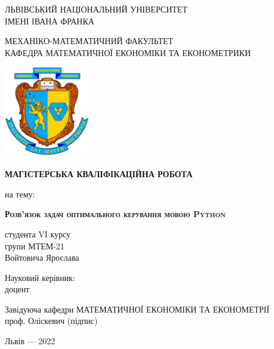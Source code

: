 \documentclass[a4paper,12pt]{extreport}
\begin{document}
    \begin{titlepage}%
        \begin{center}
            {ЛЬВІВСЬКИЙ НАЦІОНАЛЬНИЙ УНІВЕРСИТЕТ \\ ІМЕНІ ІВАНА ФРАНКА}\par
            {МЕХАНІКО-МАТЕМАТИЧНИЙ ФАКУЛЬТЕТ \\ КАФЕДРА МАТЕМАТИЧНОЇ ЕКОНОМІКИ ТА ЕКОНОМЕТРИКИ}\par
            \begin{center}
            \includegraphics[height=4cm]{figures/title_mexmat.jpg}
            \end{center}
            \vspace{10mm}
            \bf{\small{МАГІСТЕРСЬКА КВАЛІФІКАЦІЙНА РОБОТА}}\par
        {\small{на тему:}}\par
            \vspace{20mm}
            {\LARGE{\bf{\scshape{Розв'язок задач оптимального керування мовою Python}}}}\par
            \vspace{5mm}
            {}\par %
        \end{center}
        \vfill
        \hfill
        \begin{flushright}
        \begin{minipage}[t]{80mm}
            \flushright
            студента VI курсу\\
            групи МТЕМ-21\\
            {Войтовича Ярослава}\par
            \vspace{2ex}
            Науковий керівник:\\
            {доцент}\\
        \end{minipage}
        \end{flushright}
        \vspace{10mm}
        \begin{flushleft}
        \begin{minipage}[t]{80mm}
            \flushleft
            Завідуюча кафедри МАТЕМАТИЧНОЇ ЕКОНОМІКИ ТА ЕКОНОМЕТРІЇ\\
            проф. Оліскевич (підпис)
        \end{minipage}
        \end{flushleft}
        \vfill
        \vspace{10mm}
        \begin{center}Львів --- 2022\end{center}
    \end{titlepage}
 
\end{document}
